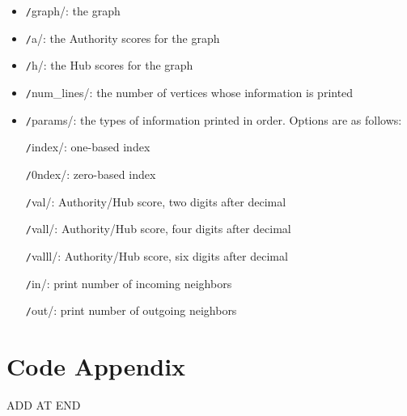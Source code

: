\documentclass[12pt, titlepage, twoside]{amsart}
\theoremstyle{remark}
\begin{document}
\begin{itemize}[label={}]
\item \texttt/graph/: the graph

\item \texttt/a/: the Authority scores for the graph

\item \texttt/h/: the Hub scores for the graph

\item \texttt/num_lines/: the number of vertices whose information is printed

\item \texttt/params/: the types of information printed in order. Options are as follows:

\texttt/index/: one-based index

\texttt/0ndex/: zero-based index

\texttt/val/: Authority/Hub score, two digits after decimal

\texttt/vall/: Authority/Hub score, four digits after decimal

\texttt/valll/: Authority/Hub score, six digits after decimal

\texttt/in/: print number of incoming neighbors

\texttt/out/: print number of outgoing neighbors
\end{itemize}






\section{Code Appendix}

ADD AT END
\end{document}

